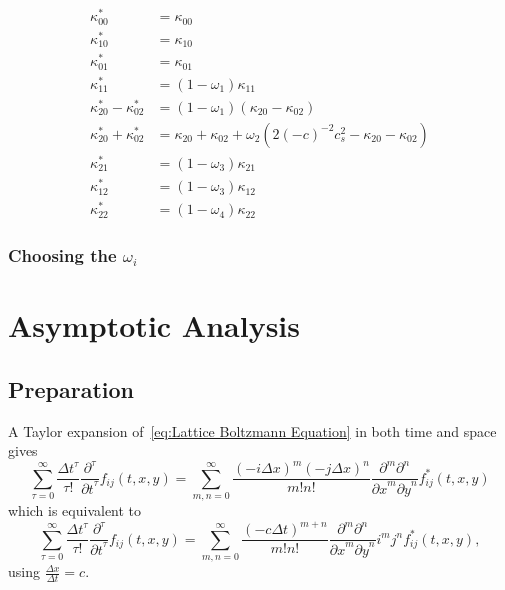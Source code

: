 \documentclass{article}
\begin{document}
\begin{equation}
  \begin{aligned}
    \kappa_{00}^{*} & = \kappa_{00} \\
    \kappa_{10}^{*} & = \kappa_{10} \\
    \kappa_{01}^{*} & = \kappa_{01} \\
    \kappa_{11}^{*} & = (1-\omega_1)\kappa_{11} \\
    \kappa_{20}^{*} - \kappa_{02}^{*}
      & = (1-\omega_1) (\kappa_{20} - \kappa_{02}) \\
    \kappa_{20}^{*} + \kappa_{02}^{*}
      & = \kappa_{20} + \kappa_{02} + \omega_2 \left( 2 {(-c)}^{-2} c_s^2 - \kappa_{20} - \kappa_{02} \right) \\
    \kappa_{21}^{*} & = (1-\omega_3)\kappa_{21} \\
    \kappa_{12}^{*} & = (1-\omega_3)\kappa_{12} \\
    \kappa_{22}^{*} & = (1-\omega_4)\kappa_{22}
  \end{aligned}
\end{equation}

\subsubsection{Choosing the \texorpdfstring{$\omega_i$}{omega_i}}
\label{subs:Choosing the omega_i}


\section{Asymptotic Analysis}
\label{sec:Asymptotic Analysis}
\subsection{Preparation}
\label{sub:Preparation}

A Taylor expansion of~\eqref{eq:Lattice Boltzmann Equation} in both time and space gives
\begin{equation*}
  \sum_{\tau = 0}^\infty \frac{{\Delta t}^\tau }{\tau!} \frac{\partial^\tau}{{\partial t}^\tau} f_{ij}(t, x, y) =
  \sum_{m,n = 0}^\infty \frac{{(-i\Delta x)}^m{(-j\Delta x)}^n} {m!n!} \frac{\partial^m \partial^n}{ {\partial x}^m{\partial y}^n} f^*_{ij}(t, x, y)
\end{equation*}
which is equivalent to
\begin{equation}
  \label{eq:Taylor LB1}
  \sum_{\tau = 0}^\infty \frac{{\Delta t}^\tau }{\tau!} \frac{\partial^\tau}{{\partial t}^\tau} f_{ij}(t, x, y) =
    \sum_{m,n = 0}^\infty \frac{{(-c\Delta t)}^{m+n}} {m!n!} \frac{\partial^m \partial^n}{ {\partial x}^m{\partial y}^n} i^m j^n f^*_{ij}(t, x, y),
\end{equation}
using $\frac{\Delta x} {\Delta{t}} = c$.
\end{document}
